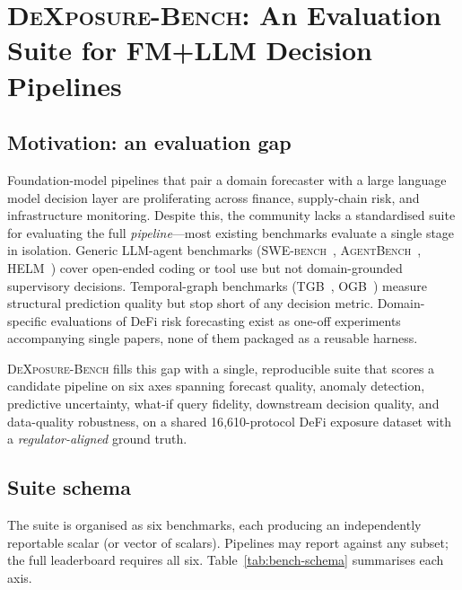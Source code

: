 
\section{\textsc{DeXposure-Bench}: An Evaluation Suite for FM+LLM Decision Pipelines}
\label{sec:bench}

\subsection{Motivation: an evaluation gap}

Foundation-model pipelines that pair a domain forecaster with a large
language model decision layer are proliferating across finance,
supply-chain risk, and infrastructure monitoring.  Despite this, the
community lacks a standardised suite for evaluating the full
\emph{pipeline}---most existing benchmarks evaluate a single stage in
isolation.  Generic LLM-agent benchmarks
(\textsc{SWE-bench}~\cite{jimenez2024swebench},
\textsc{AgentBench}~\cite{liu2024agentbench},
\textsc{HELM}~\cite{liang2022helm}) cover open-ended coding or tool use
but not domain-grounded supervisory decisions.  Temporal-graph
benchmarks (\textsc{TGB}~\cite{huang2023tgb},
\textsc{OGB}~\cite{hu2020ogb}) measure structural prediction quality
but stop short of any decision metric.  Domain-specific evaluations of
DeFi risk forecasting exist as one-off experiments accompanying single
papers, none of them packaged as a reusable harness.

\textsc{DeXposure-Bench} fills this gap with a single, reproducible
suite that scores a candidate pipeline on six axes spanning forecast
quality, anomaly detection, predictive uncertainty, what-if query
fidelity, downstream decision quality, and data-quality robustness, on
a shared 16{,}610-protocol DeFi exposure dataset with a
\emph{regulator-aligned} ground truth.

\subsection{Suite schema}

The suite is organised as six benchmarks, each producing an
independently reportable scalar (or vector of scalars).  Pipelines may
report against any subset; the full leaderboard requires all six.
Table~\ref{tab:bench-schema} summarises each axis.

